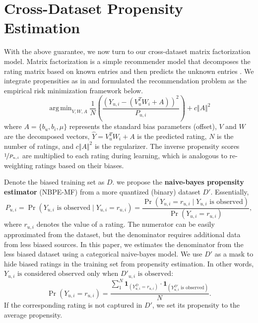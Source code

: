 \documentclass{article}
\newcommand{\vect}[1]{\boldsymbol{#1}}
\DeclareMathOperator*{\argmin}{arg\,min}
\begin{document}
\section{Cross-Dataset Propensity Estimation}
With the above guarantee, we now turn to our cross-dataset matrix factorization model. Matrix factorization is a simple recommender model that decomposes the rating matrix based on known entries and then predicts the unknown entries \cite{koren2009matrix}. We integrate propensities as in \citep{schnabel2016recommendations} and formulated the recommendation problem as the empirical risk minimization framework below. 
\begin{equation} \argmin_{V,W,A} \frac{1}{N}\left(\frac{(Y_{u,i}- (V_u^TW_i + A))^2}{P_{u,i}} \right) + c \Vert A \Vert^2
\end{equation}
where $A = \{ b_u, b_i, \mu \}$ represents the standard bias parameters (offset), $V$ and $W$ are the decomposed vectors, $\hat{Y} = V_u^TW_i + A$ is the predicted rating, $N$ is the number of ratings, and $c \Vert A \Vert^2$ is the regularizer. The inverse propensity scores $\nicefrac{1}{P_{u,i}}$ are multiplied to each rating during learning, which is analogous to re-weighting ratings based on their biases.

Denote the biased training set as $D$. we propose the \textbf{naive-bayes propensity estimator} (NBPE-MF) from a more quantized (binary) dataset $D'$. Essentially,
\begin{equation} 
  P_{u,i} = \Pr(Y_{u,i} \text{ is observed} \mid Y_{u,i} = r_{u,i}) = \frac{\Pr(Y_{u,i} = r_{u,i} \mid Y_{u,i} \text{ is observed})}{\Pr(Y_{u,i} = r_{u,i})},
\end{equation}
where $r_{u,i}$ denotes the value of a rating. The numerator can be easily approximated from the dataset, but the denominator requires additional data from less biased sources. In this paper, we estimates the denominator from the less biased dataset using a categorical naive-bayes model. We use $D'$ as a mask to hide biased ratings in the training set from propensity estimation. In other words, $Y_{u,i} \text{ is considered observed}$ only when $D'_{u,i} \text{ is observed}$:
\begin{equation} 
  \Pr(Y_{u,i} = r_{u,i}) = \frac{\sum_1^N \vect 1_{(Y^D_{u,i} = r_{u,i})} \cdot \vect 1_{(Y^{D'}_{u,i} \text{ is observed})} }{N}.
\end{equation}
If the corresponding rating is not captured in $D'$, we set its propensity to the average propensity.
\end{document}
